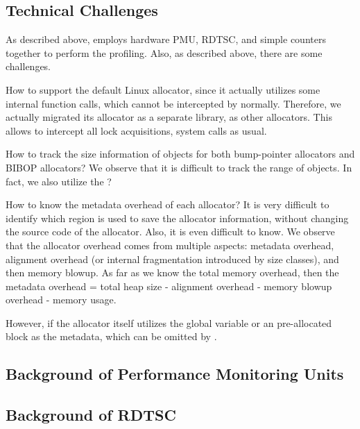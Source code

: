 \subsection{Technical Challenges}

As described above, \MP{} employs hardware PMU, RDTSC, and simple counters together to perform the profiling. Also, as described above, there are some challenges. 
 

How to support the default Linux allocator, since it actually utilizes some internal function calls, which cannot be intercepted by \MP{} normally. Therefore, we actually migrated its allocator as a separate library, as other allocators. This allows \MP{} to intercept all lock acquisitions, system calls as usual. 

How to track the size information of objects for both bump-pointer allocators and BIBOP allocators? We observe that it is difficult to track the range of objects. In fact, we also utilize the ?

How to know the metadata overhead of each allocator? It is very difficult to identify which region is used to save the allocator information, without changing the source code of the allocator. Also, it is even difficult to know. We observe that the allocator overhead comes from multiple aspects: metadata overhead, alignment overhead (or internal fragmentation introduced by size classes), and then memory blowup. 
As far as we know the total memory overhead, then the metadata overhead = total heap size - alignment overhead - memory blowup overhead - memory usage.

However, if the allocator itself utilizes the global variable or an pre-allocated block as the metadata, which can be omitted by \MP{}. 

 


\subsection{Background of Performance Monitoring Units}
\label{sec:pmu}

\subsection{Background of RDTSC}

\label{sec:rdtsc}






